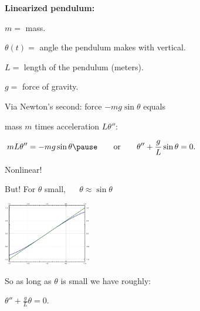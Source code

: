 \documentclass[10pt,aspectratio=169]{beamer}
\begin{document}
\begin{frame}
\textbf{Linearized pendulum:}

\vspace*{-12pt}
\hspace*{3.2in}%

\vspace*{-1.4in}

$m = {}$ mass.

$\theta(t) = {}$ angle the pendulum makes with vertical.

$L = {}$ length of the pendulum (meters).

$g = {}$ force of gravity.

\medskip
\pause

Via Newton's second: force $-mg \sin \theta$ equals

mass $m$ times acceleration
$L \theta''$:

\medskip

\qquad
$
\displaystyle
mL\theta'' = -mg \sin \theta
\pause
\qquad
\text{or}
\qquad
\theta'' + \frac{g}{L} \sin \theta = 0 .
$

\pause

Nonlinear!

\medskip
\pause

But!  For $\theta$ small, ~~ $\theta \approx \sin \theta$

\vspace*{-12pt}%
\hspace*{3.2in}%
\includegraphics[width=1.5in]{../figures/mv-sintheta.pdf}

\vspace*{-0.8in}
\pause

So as long as $\theta$ is small we have roughly:

\medskip

\qquad
$
\displaystyle
\theta'' + \frac{g}{L} \theta = 0 .
$

\vspace*{12pt}

\end{frame}
\end{document}
